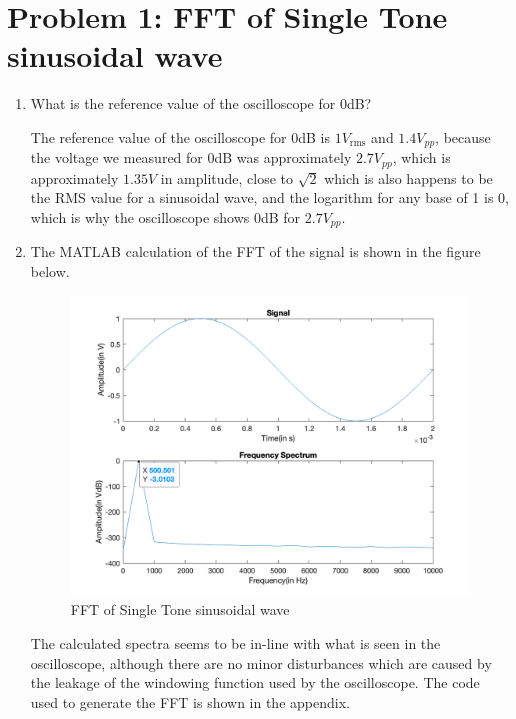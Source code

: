 \section{Problem 1: FFT of Single Tone sinusoidal wave}

\begin{enumerate}
    \item What is the reference value of the oscilloscope for 0dB?

          The reference value of the oscilloscope for 0dB is $1V_{\text{rms}}$ and $1.4V_{pp}$, because the voltage we measured for 0dB was approximately $2.7V_{pp}$, which is approximately $1.35V$ in amplitude, close to $\sqrt{2}$ which is also happens to be the RMS value for a sinusoidal wave, and the logarithm for any base of 1 is 0, which is why the oscilloscope shows 0dB for $2.7V_{pp}$.
    \item The MATLAB calculation of the FFT of the signal is shown in the figure below.
          \begin{figure}[H]
              \centering
              \includegraphics[width=0.75\linewidth]{images/evaluation_problem2.png}
              \caption{FFT of Single Tone sinusoidal wave}
              \label{fig:fft_single_tone}
          \end{figure}
          The calculated spectra seems to be in-line with what is seen in the oscilloscope, although there are no minor disturbances which are caused by the leakage of the windowing function used by the oscilloscope.
          The code used to generate the FFT is shown in the appendix.


\end{enumerate}
